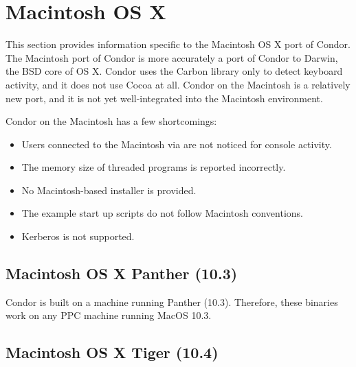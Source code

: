 \section{\label{sec:platform-macos}Macintosh OS X}

This section provides information specific to the Macintosh OS X port of
Condor.
The Macintosh port of Condor is more accurately a port of Condor to
Darwin, the BSD core of OS X. Condor uses the Carbon library only to
detect keyboard activity, and it does not use Cocoa at all.
Condor on the Macintosh is a relatively new port, and it 
is not yet well-integrated
into the Macintosh environment. 

Condor on the Macintosh has a few shortcomings:
\begin{itemize}
\item Users connected to the Macintosh via  are not
noticed for console activity.
\item The memory size of threaded programs is reported incorrectly.
\item No Macintosh-based installer is provided.
\item The example start up scripts do not follow Macintosh conventions.
\item Kerberos is not supported.
\end{itemize}


\subsection{\label{sec:platform-macos-panther}Macintosh OS X Panther (10.3)}

Condor \VersionNotice 
is built on a machine running Panther (10.3).
Therefore, these binaries work on any PPC machine running MacOS 10.3.


\subsection{\label{sec:platform-macos-tiger}Macintosh OS X Tiger (10.4)}

